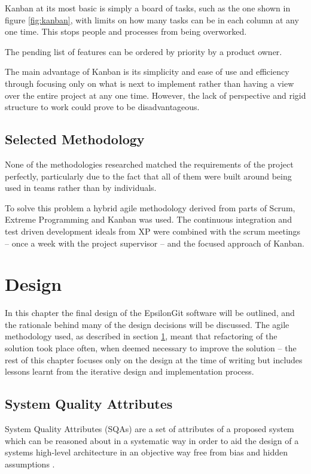 \documentclass[11pt]{book}
\begin{document}
Kanban at its most basic is simply a board of tasks, such as the one shown in figure \ref{fig:kanban}, with limits on how many tasks can be in each column at any one time. This stops people and processes from being overworked.

The pending list of features can be ordered by priority by a product owner.

The main advantage of Kanban is its simplicity and ease of use and efficiency through focusing only on what is next to implement rather than having a view over the entire project at any one time. However, the lack of perspective and rigid structure to work could prove to be disadvantageous. 

\section{Selected Methodology} 
\label{selectedmethodology}
None of the methodologies researched matched the requirements of the project perfectly, particularly due to the fact that all of them were built around being used in teams rather than by individuals.

To solve this problem a hybrid agile methodology derived from parts of Scrum, Extreme Programming and Kanban was used. The continuous integration and test driven development ideals from XP were combined with the scrum meetings -- once a week with the project supervisor -- and the focused approach of Kanban.

\chapter{Design}
\label{design}
In this chapter the final design of the EpsilonGit software will be outlined, and the rationale behind many of the design decisions will be discussed. The agile methodology used, as described in section \ref{selectedmethodology}, meant that refactoring of the solution took place often, when deemed necessary to improve the solution -- the rest of this chapter focuses only on the design at the time of writing but includes lessons learnt from the iterative design and implementation process.

\section{System Quality Attributes}
System Quality Attributes (SQAs) are a set of attributes of a proposed system which can be reasoned about in a systematic way in order to aid the design of a systems high-level architecture in an objective way free from bias and hidden assumptions \cite{qualityattributes}.  
\end{document}

